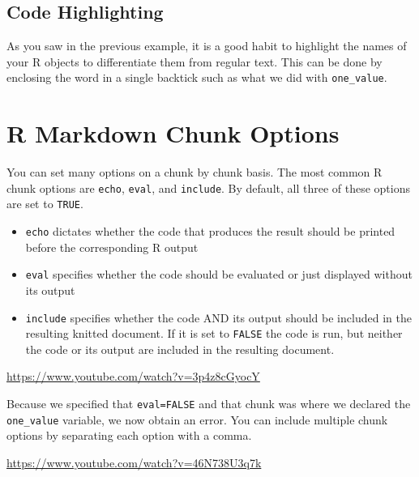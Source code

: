 \documentclass[]{tufte-book}
\begin{document}
\subsection{Code Highlighting}\label{code-highlighting}

As you saw in the previous example, it is a good habit to highlight the names of your R objects to differentiate them from regular text. This can be done by enclosing the word in a single backtick such as what we did with \texttt{one\_value}.

\section{R Markdown Chunk Options}\label{r-markdown-chunk-options}

You can set many options on a chunk by chunk basis. The most common R chunk options are \texttt{echo}, \texttt{eval}, and \texttt{include}. By default, all three of these options are set to \texttt{TRUE}.

\begin{itemize}
\item
  \texttt{echo} dictates whether the code that produces the result should be printed before the corresponding R output
\item
  \texttt{eval} specifies whether the code should be evaluated or just displayed without its output
\item
  \texttt{include} specifies whether the code AND its output should be included in the resulting knitted document. If it is set to \texttt{FALSE} the code is run, but neither the code or its output are included in the resulting document.
\end{itemize}

\vspace{0.1in}\begin{center}\footnotesize{\url{https://www.youtube.com/watch?v=3p4z8cGyocY}}\end{center}\vspace{0.1in}

Because we specified that \texttt{eval=FALSE} and that chunk was where we declared the \texttt{one\_value} variable, we now obtain an error. You can include multiple chunk options by separating each option with a comma.

\vspace{0.1in}\begin{center}\footnotesize{\url{https://www.youtube.com/watch?v=46N738U3q7k}}\end{center}\vspace{0.1in}
\end{document}
